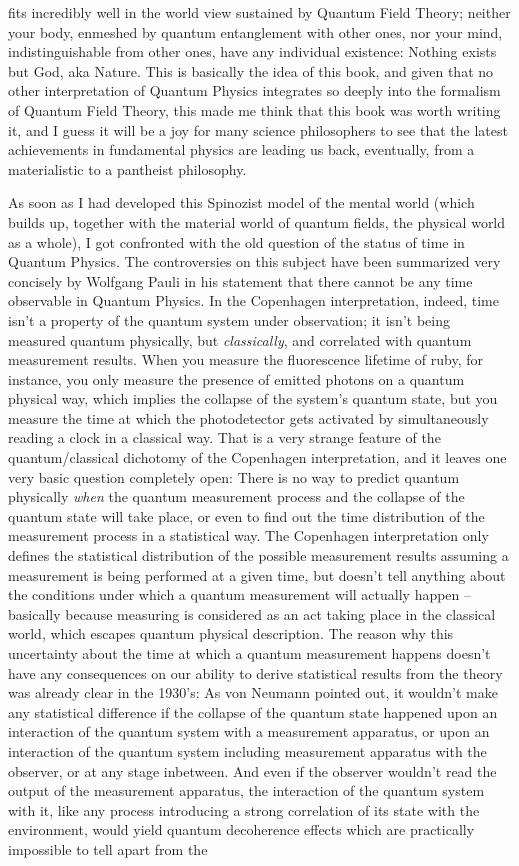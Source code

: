 fits incredibly well in the world view sustained by Quantum Field Theory; neither your body, enmeshed by quantum entanglement with other ones, nor your mind, indistinguishable from other ones, have any individual existence: Nothing exists but God, aka Nature. This is basically the idea of this book, and given that no other interpretation of Quantum Physics integrates so deeply into the formalism of Quantum Field Theory, this made me think that this book was worth writing it, and I guess it will be a joy for many science philosophers to see that the latest achievements in fundamental physics are leading us back, eventually, from a materialistic to a pantheist philosophy.

As soon as I had developed this Spinozist model of the mental world (which builds up, together with the material world of quantum fields, the physical world as a whole), I got confronted with the old question of the status of time in Quantum Physics. The controversies on this subject have been summarized very concisely by Wolfgang Pauli in his statement that there cannot be any time observable in Quantum Physics. In the Copenhagen interpretation, indeed, time isn't a property of the quantum system under observation; it isn't being measured quantum physically, but \textit{classically}, and correlated with quantum measurement results. When you measure the fluorescence lifetime of ruby, for instance, you only measure the presence of emitted photons on a quantum physical way, which implies the collapse of the system's quantum state, but you measure the time at which the photodetector gets activated by simultaneously reading a clock in a classical way. That is a very strange feature of the quantum/classical dichotomy of the Copenhagen interpretation, and it leaves one very basic question completely open: There is no way to predict quantum physically \textit{when} the quantum measurement process and the collapse of the quantum state will take place, or even to find out the time distribution of the measurement process in a statistical way. The Copenhagen interpretation only defines the statistical distribution of the possible measurement results assuming a measurement is being performed at a given time, but doesn't tell anything about the conditions under which a quantum measurement will actually happen -- basically because measuring is considered as an act taking place in the classical world, which escapes quantum physical description. The reason why this uncertainty about the time at which a quantum measurement happens doesn't have any consequences on our ability to derive statistical results from the theory was already clear in the 1930's: As von Neumann pointed out, it wouldn't make any statistical difference if the collapse of the quantum state happened upon an interaction of the quantum system with a measurement apparatus, or upon an interaction of the quantum system including measurement apparatus with the observer, or at any stage inbetween. And even if the observer wouldn't read the output of the measurement apparatus, the interaction of the quantum system with it, like any process introducing a strong correlation of its state with the environment, would yield quantum decoherence effects which are practically impossible to tell apart from the 